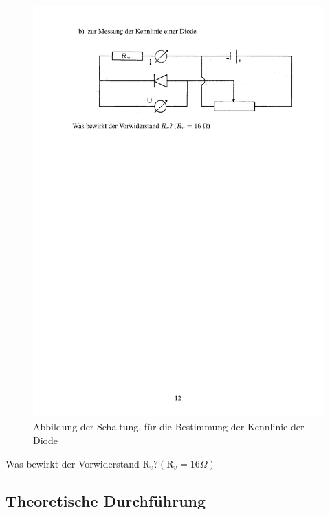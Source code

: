 \documentclass[12pt]{scrartcl}
\begin{document}
\begin{enumerate}
	\begin{figure}[htbp] 
 	 \centering
 	   \includegraphics[trim = 1mm 152mm 1mm 15mm, clip, scale = 1]{abb_versuch_6b.pdf}
  	\caption[Abbildung der Schaltung, für die Bestimmung der Kennlinie der Diode]{Abbildung der Schaltung, für die Bestimmung der Kennlinie der Diode\footnotemark}
  	\label{fig:abb_versuch_6b}
	\end{figure}
	
	Was bewirkt der Vorwiderstand
	$\text{R}_v? (\text{R}_v= 16\Omega)$
\end{enumerate}


\subsection{Theoretische Durchführung}
\end{document}
